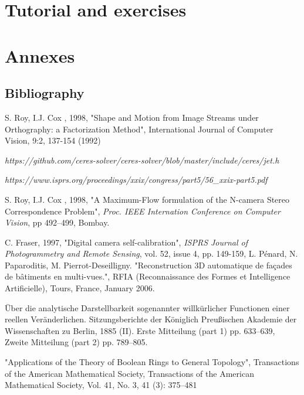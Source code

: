 \part{Tutorial and exercises}




\part{Annexes}

\appendix

\chapter{Bibliography}


\begin{thebibliography}{AAA}
      S. Roy, I.J. Cox , 1998, "Shape and Motion from Image 
            Streams under Orthography: a Factorization Method", International Journal of Computer Vision, 
            9:2, 137-154 (1992)


     \emph{https://github.com/ceres-solver/ceres-solver/blob/master/include/ceres/jet.h}

     \emph{https://www.isprs.org/proceedings/xxix/congress/part5/56\_xxix-part5.pdf}

      S. Roy, I.J. Cox , 1998, "A Maximum-Flow
            formulation of the N-camera Stereo Correspondence
      Problem", \emph{Proc. IEEE Internation Conference on
      Computer Vision}, pp 492--499, Bombay.

     C. Fraser, 1997, "Digital camera self-calibration",
   \emph{ISPRS Journal of Photogrammetry and Remote Sensing}, vol. 52, issue 4, pp. 149-159,
      L. Pénard, N. Paparoditis, M. Pierrot-Deseilligny.
           "Reconstruction 3D automatique de façades de bâtiments en multi-vues.",
            RFIA (Reconnaissance des Formes et Intelligence Artificielle),
            Tours, France, January 2006.

     Über die analytische Darstellbarkeit sogenannter willkürlicher Functionen
           einer reellen Veränderlichen. Sitzungsberichte der Königlich Preußischen Akademie der Wissenschaften zu Berlin,
           1885 (II).  Erste Mitteilung (part 1) pp. 633–639, Zweite Mitteilung (part 2) pp. 789–805.

     "Applications of the Theory of Boolean Rings to General Topology",
          Transactions of the American Mathematical Society, Transactions of the American Mathematical Society,
          Vol. 41, No. 3, 41 (3): 375–481

\end{thebibliography}


\printindex








